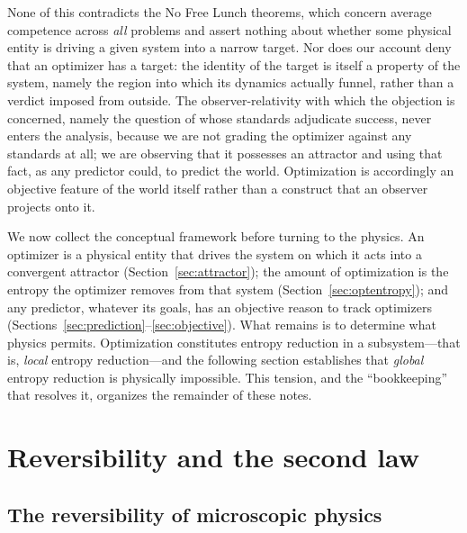 \documentclass[11pt]{article}
\begin{document}
None of this contradicts the No Free Lunch theorems, which concern average competence across \emph{all} problems and assert nothing about whether some physical entity is driving a given system into a narrow target. Nor does our account deny that an optimizer has a target: the identity of the target is itself a property of the system, namely the region into which its dynamics actually funnel, rather than a verdict imposed from outside. The observer-relativity with which the objection is concerned, namely the question of whose standards adjudicate success, never enters the analysis, because we are not grading the optimizer against any standards at all; we are observing that it possesses an attractor and using that fact, as any predictor could, to predict the world. Optimization is accordingly an objective feature of the world itself rather than a construct that an observer projects onto it.

We now collect the conceptual framework before turning to the physics. An optimizer is a physical entity that drives the system on which it acts into a convergent attractor (Section~\ref{sec:attractor}); the amount of optimization is the entropy the optimizer removes from that system (Section~\ref{sec:optentropy}); and any predictor, whatever its goals, has an objective reason to track optimizers (Sections~\ref{sec:prediction}--\ref{sec:objective}). What remains is to determine what physics permits. Optimization constitutes entropy reduction in a subsystem---that is, \emph{local} entropy reduction---and the following section establishes that \emph{global} entropy reduction is physically impossible. This tension, and the ``bookkeeping'' that resolves it, organizes the remainder of these notes.
\section{Reversibility and the second law}
\label{sec:secondlaw}

\subsection{The reversibility of microscopic physics}
\label{sec:reversible}
\end{document}
